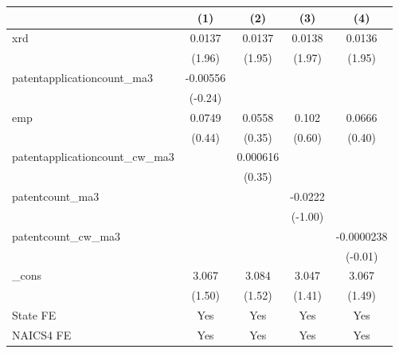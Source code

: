 {
\def\sym#1{\ifmmode^{#1}\else\(^{#1}\)\fi}
\begin{tabular}{l*{4}{c}}
\hline\hline
            &\multicolumn{1}{c}{(1)}         &\multicolumn{1}{c}{(2)}         &\multicolumn{1}{c}{(3)}         &\multicolumn{1}{c}{(4)}         \\
\hline
xrd         &      0.0137         &      0.0137         &      0.0138         &      0.0136         \\
            &      (1.96)         &      (1.95)         &      (1.97)         &      (1.95)         \\
[1em]
patentapplicationcount\_ma3&    -0.00556         &                     &                     &                     \\
            &     (-0.24)         &                     &                     &                     \\
[1em]
emp         &      0.0749         &      0.0558         &       0.102         &      0.0666         \\
            &      (0.44)         &      (0.35)         &      (0.60)         &      (0.40)         \\
[1em]
patentapplicationcount\_cw\_ma3&                     &    0.000616         &                     &                     \\
            &                     &      (0.35)         &                     &                     \\
[1em]
patentcount\_ma3&                     &                     &     -0.0222         &                     \\
            &                     &                     &     (-1.00)         &                     \\
[1em]
patentcount\_cw\_ma3&                     &                     &                     &  -0.0000238         \\
            &                     &                     &                     &     (-0.01)         \\
[1em]
\_cons      &       3.067         &       3.084         &       3.047         &       3.067         \\
            &      (1.50)         &      (1.52)         &      (1.41)         &      (1.49)         \\
[1em]
State FE    &         Yes         &         Yes         &         Yes         &         Yes         \\
[1em]
NAICS4 FE   &         Yes         &         Yes         &         Yes         &         Yes         \\

\end{tabular}}
